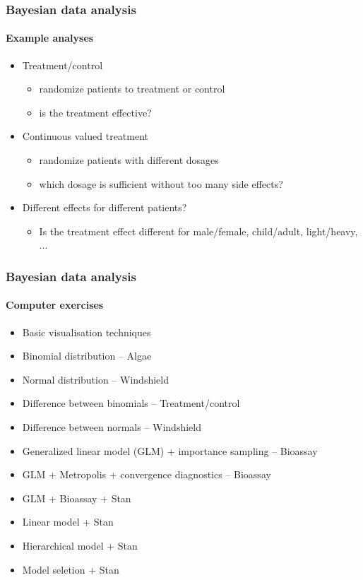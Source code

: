 \documentclass[english]{beamer}
\begin{document}

\begin{frame}
  \frametitle{Bayesian data analysis}  %
  \framesubtitle{Example analyses}
  \begin{itemize}
  \item Treatment/control
    \begin{itemize}
    \item randomize patients to treatment or control
    \item is the treatment effective?
    \end{itemize}
    \pause
  \item Continuous valued treatment
    \begin{itemize}
    \item randomize patients with different dosages
    \item which dosage is sufficient without too many side effects?
    \end{itemize}
    \pause
  \item Different effects for different patients?
    \begin{itemize}
    \item Is the treatment effect different for male/female,
      child/adult, light/heavy, ...
    \end{itemize}
  \end{itemize}

\end{frame}

\begin{frame}
  \frametitle{Bayesian data analysis}  %
  \framesubtitle{Computer exercises}
  \begin{itemize}
  \item Basic visualisation techniques
  \item Binomial distribution -- Algae
  \item Normal distribution -- Windshield
  \item Difference between binomials -- Treatment/control
  \item Difference between normals -- Windshield
  \item Generalized linear model (GLM) + importance sampling -- Bioassay
  \item GLM + Metropolis + convergence diagnostics -- Bioassay
  \item GLM + Bioassay + Stan
  \item Linear model + Stan
  \item Hierarchical model + Stan
  \item Model seletion + Stan
  \end{itemize}

\end{frame}
\end{document}
